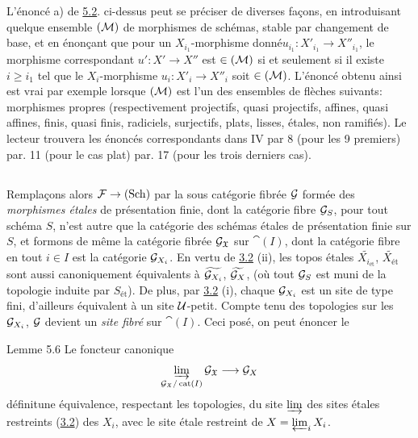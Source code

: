 \documentclass[10pt]{../fichiers-configuration-latex/smfart}
\begin{document}
L'énoncé a) de \hyperref[VII.subsec5.2]{5.2}. ci-dessus peut se préciser de diverses façons,
en introduisant quelque ensemble $({\mathcal M})$ de morphismes de
schémas, stable par changement de base, et en énonçant que pour un
$X_{i_1}$-morphisme donné\pageoriginale $u_{i_1} : X'_{i_1} \to
X''_{i_1}$, le
morphisme correspondant $u': X'\to X''$ est $\in
({\mathcal M})$ si et seulement si il existe $i\geq i_{1}$ tel que le
$X_{i}$-morphisme $u_{i}:X'_{i}\to X''_{i}$ soit $\in
({\mathcal M})$. L'énoncé obtenu ainsi est vrai par exemple lorsque
$({\mathcal M})$ est l'un des ensembles de flèches suivants: morphismes
propres (respectivement projectifs, \resp quasi projectifs, \resp
affines, \resp quasi affines, \resp finis, \resp quasi finis, \resp
radiciels, \resp surjectifs, \resp plats, \resp lisses, \resp étales,
\resp non ramifiés). Le lecteur trouvera les énoncés correspondants
dans \EGA IV par 8 (pour les 9 premiers) par. 11 (pour le cas plat) par.
17 (pour les trois derniers cas).

\subsection{}

Remplaçons alors $\Ff \to (\Sch)$ par la sous catégorie
fibrée ${\mathcal G}$ formée des \emph{morphismes étales} de
présentation finie, dont la catégorie fibre ${\mathcal G}_{S}$, pour
tout schéma $S$, n'est autre que la catégorie des schémas étales de
présentation finie sur $S$, et formons de même la catégorie fibrée
${\mathcal G}_{\mathfrak{X}}$ sur $\cat(I)$, dont la catégorie fibre en
tout $i \in I$ est la catégorie ${\mathcal G}_{X_i}$. En vertu de \hyperref[VII.cor3.2]{3.2}
(ii), les topos étales $\widetilde{X_{i_{\text{ét}}}}$,
$\widetilde{X_{\text{ét}}}$ sont aussi canoniquement équivalents à
$\widetilde{{\mathcal G}_{X_{i}}}$,
$\widetilde{{\mathcal G}_{X}}$, (où tout ${\mathcal G}_S$ est muni
de la topologie induite par $S_{\text{ét}}$). De plus, par \hyperref[VII.cor3.2]{3.2} (i), chaque
${\mathcal G}_{X_i}$ est un site de type fini, d'ailleurs équivalent à
un site ${\mathcal U}$-petit. Compte tenu des topologies sur les
${\mathcal G}_{X_i}$, ${\mathcal G}$ devient un \emph{site fibré} sur
$\cat(I)$. Ceci posé, on peut énoncer le

\begin{enonce*}{Lemme 5.6}
Le foncteur canonique
$$
\varinjlim_{\Gg_{\mathfrak{X}}/\cat(I)}
\Gg_{\mathfrak{X}} \to \Gg_X
$$
définit\pageoriginale une équivalence, respectant les topologies, du site
$\varinjlim$ des sites étales restreints (\hyperref[VII.cor3.2]{3.2}) des $X_i$, avec le site
étale restreint de $X = \varprojlim_i X_i$.
\end{enonce*}
\end{document}
